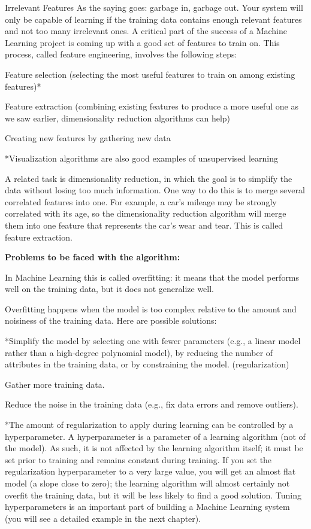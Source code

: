 \documentclass[12pt, a4paper]{article}
\begin{document}
	Irrelevant Features
	As the saying goes: garbage in, garbage out. Your system will only be capable of learning if the training data contains enough relevant features and not too many irrelevant ones. A critical part of the success of a Machine Learning project is coming up with a good set of features to train on. This process, called feature engineering, involves the following steps:
	
	Feature selection (selecting the most useful features to train on among existing features)*
	
	Feature extraction (combining existing features to produce a more useful one as we saw earlier, dimensionality reduction algorithms can help)
	
	Creating new features by gathering new data
	
	*Visualization algorithms are also good examples of unsupervised learning
	
	A related task is dimensionality reduction, in which the goal is to simplify the data without losing too much information. One way to do this is to merge several correlated features into one. For example, a car’s mileage may be strongly correlated with its age, so the dimensionality reduction algorithm will merge them into one feature that represents the car’s wear and tear. This is called feature extraction.
	
	\textbf{Problems to be faced with the algorithm:}
	
	In Machine Learning this is called overfitting: it means that the model performs well on the training data, but it does not generalize well.
	
	Overfitting happens when the model is too complex relative to the amount and noisiness of the training data. Here are possible solutions:
	
	*Simplify the model by selecting one with fewer parameters (e.g., a linear model rather than a high-degree polynomial model), by reducing the number of attributes in the training data, or by constraining the model. (regularization)
	
	Gather more training data.
	
	Reduce the noise in the training data (e.g., fix data errors and remove outliers).
	
	*The amount of regularization to apply during learning can be controlled by a hyperparameter. A hyperparameter is a parameter of a learning algorithm (not of the model). As such, it is not affected by the learning algorithm itself; it must be set prior to training and remains constant during training. If you set the regularization hyperparameter to a very large value, you will get an almost flat model (a slope close to zero); the learning algorithm will almost certainly not overfit the training data, but it will be less likely to find a good solution. Tuning hyperparameters is an important part of building a Machine Learning system (you will see a detailed example in the next chapter).
	
\end{document}
